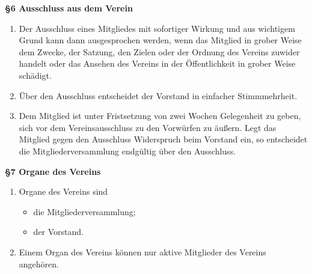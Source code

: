 \documentclass[a4paper,
               12pt,
               titlepage,
               parskip=half]{scrartcl}
\begin{document}
\newpage

\textbf{§6 Ausschluss aus dem Verein}
{\small
	\begin{enumerate}
		\item Der Ausschluss eines Mitgliedes mit sofortiger Wirkung und aus wichtigem Grund kann dann ausgesprochen werden, wenn das Mitglied in grober Weise dem Zwecke, der Satzung, den Zielen oder der Ordnung des Vereins zuwider handelt oder das Ansehen des Vereins in der Öffentlichkeit in grober Weise schädigt.
		\item Über den Ausschluss entscheidet der Vorstand in einfacher Stimmmehrheit.
		\item Dem Mitglied ist unter Fristsetzung von zwei Wochen Gelegenheit zu geben, sich vor dem Vereinsausschluss zu den Vorwürfen zu äußern. Legt das Mitglied gegen den Ausschluss Widerspruch beim Vorstand ein, so entscheidet die Mitgliederversammlung endgültig über den Ausschluss.
	\end{enumerate}
}

\vspace{1.0em}

\textbf{§7 Organe des Vereins}
{\small
	\begin{enumerate}
		\item Organe des Vereins sind
		\begin{itemize}
			\item die Mitgliederversammlung;
			\item der Vorstand.
		\end{itemize}
	    \item Einem Organ des Vereins können nur aktive Mitglieder des Vereins angehören.
	\end{enumerate}
}

\vspace{1.0em}
\end{document}
